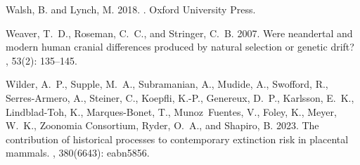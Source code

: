 \documentclass{article}
\begin{document}
\begin{thebibliography}{}
    Walsh, B. and Lynch, M. 2018.
    .
    \newblock Oxford University Press.

    Weaver, T.~D., Roseman, C.~C., and Stringer, C.~B. 2007.
    \newblock Were neandertal and modern human cranial differences produced by
    natural selection or genetic drift?
    , {53}(2): 135--145.

    Wilder, A.~P., Supple, M.~A., Subramanian, A., Mudide, A., Swofford, R.,
        {Serres-Armero}, A., Steiner, C., Koepfli, K.-P., Genereux, D.~P., Karlsson,
    E.~K., {Lindblad-Toh}, K., {Marques-Bonet}, T., Munoz~Fuentes, V., Foley, K.,
    Meyer, W.~K., {Zoonomia Consortium}, Ryder, O.~A., and Shapiro, B. 2023.
    \newblock The contribution of historical processes to contemporary extinction
    risk in placental mammals.
    , {380}(6643): eabn5856.

\end{thebibliography}
\end{document}
